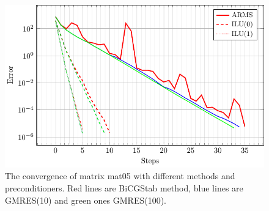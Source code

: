 \documentclass{article}
\begin{document}
	\begin{figure}
		\centering
		\includegraphics[width=\textwidth]{mat05_error.pdf}
		\caption{The convergence of matrix mat05 with different methods and preconditioners. Red lines are BiCGStab method, blue lines are GMRES(10) and green ones GMRES(100).}
			\label{fig:mat05error} 
	\end{figure}
	
	
	
		 
	
\end{document}
